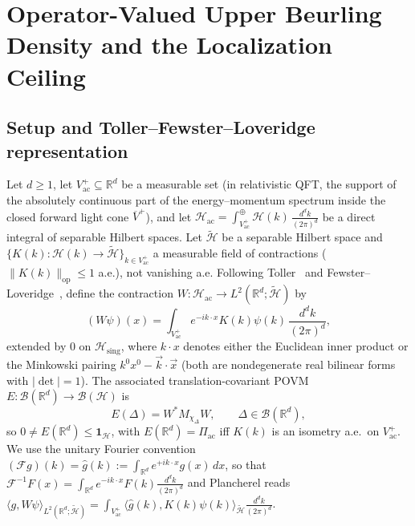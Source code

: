 \documentclass[11pt,a4paper]{article}
\theoremstyle{definition}
\theoremstyle{remark}
\newcommand{\HH}{\mathcal{H}}
\newcommand{\tH}{\widetilde{\mathcal{H}}}
\newcommand{\BB}{\mathcal{B}}
\newcommand{\Bor}{\mathcal{B}}
\newcommand{\RR}{\mathbb{R}}
\newcommand{\op}{\mathrm{op}}
\newcommand{\ac}{\mathrm{ac}}
\newcommand{\sing}{\mathrm{sing}}
\newcommand{\one}{\mathbf{1}}
\newcommand{\ip}[2]{\langle #1, #2 \rangle}
\newcommand{\norm}[1]{\|#1\|}
\begin{document}
\section{Operator-Valued Upper Beurling Density and the Localization Ceiling}
\label{sec:beurling}

\subsection{Setup and Toller--Fewster--Loveridge representation}
Let $d\ge 1$, let $V_\ac^+\subseteq\RR^d$ be a measurable set (in relativistic QFT, the support of the absolutely continuous part of the energy--momentum spectrum inside the closed forward light cone $\overline{V}^+$), and let $\HH_\ac = \int_{V_\ac^+}^\oplus \HH(k)\,\frac{d^dk}{(2\pi)^d}$ be a direct integral of separable Hilbert spaces. Let $\tH$ be a separable Hilbert space and $\{K(k):\HH(k)\to\tH\}_{k\in V_\ac^+}$ a measurable field of contractions ($\norm{K(k)}_{\op}\le 1$ a.e.), not vanishing a.e. Following Toller~\cite{Toller1999} and Fewster--Loveridge~\cite[Thm.~2.4]{FewsterLoveridge2026}, define the contraction $W:\HH_\ac\to L^2(\RR^d;\tH)$ by
\begin{equation}\label{eq:Wdef}
(W\psi)(x) = \int_{V_\ac^+} e^{-ik\cdot x} K(k)\psi(k)\,\frac{d^dk}{(2\pi)^d},
\end{equation}
extended by $0$ on $\HH_\sing$, where $k\cdot x$ denotes either the Euclidean inner product or the Minkowski pairing $k^0 x^0 - \vec{k}\cdot\vec{x}$ (both are nondegenerate real bilinear forms with $|\det|=1$). The associated translation-covariant POVM $E:\Bor(\RR^d)\to\BB(\HH)$ is
\begin{equation}\label{eq:Edef}
E(\Delta) = W^* M_{\chi_\Delta} W, \qquad \Delta\in\Bor(\RR^d),
\end{equation}
so $0\neq E(\RR^d)\le\one_\HH$, with $E(\RR^d)=\Pi_\ac$ iff $K(k)$ is an isometry a.e.\ on $V_\ac^+$. We use the unitary Fourier convention $(\mathcal{F}g)(k) = \widehat{g}(k) := \int_{\RR^d} e^{+ik\cdot x} g(x)\,dx$, so that $\mathcal{F}^{-1}F(x)=\int_{\RR^d} e^{-ik\cdot x}F(k)\frac{d^dk}{(2\pi)^d}$ and Plancherel reads $\ip{g}{W\psi}_{L^2(\RR^d;\tH)} = \int_{V_\ac^+}\ip{\widehat{g}(k)}{K(k)\psi(k)}_{\tH}\frac{d^dk}{(2\pi)^d}$.
\end{document}
